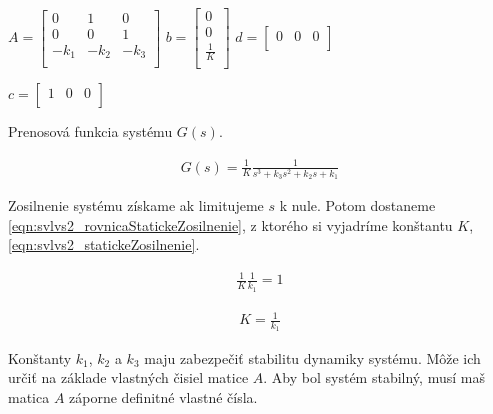 \documentclass[../main.tex]{subfiles}
\begin{document}
        \begin{center}
		$ A = 
			\begin{bmatrix} 
			0 & 1 & 0 \\ 
			0 & 0 & 1 \\ 
			-k_1 & -k_2 & -k_3  \\ 
			\end{bmatrix}$
		$ b = 
			\begin{bmatrix} 
			0 \\ 
			0 \\ 
			\frac{1}{K}  \\ 
			\end{bmatrix}$
		$ d = 
			\begin{bmatrix} 
			0 & 0 & 0  \\
			\end{bmatrix}$

		$ c = 
			\begin{bmatrix} 
			1 & 0 & 0  \\
			\end{bmatrix}$
        \end{center}

Prenosová funkcia systému $G(s)$.

	\begin{equation}
		\begin{aligned}
		G(s) = \frac{1}{K}\frac{1}{s^3+k_3s^2+k_2s+k_1}
		\end{aligned}
		\label{eqn:svlvs2_linearnySystemPrenos}
	\end{equation}

Zosilnenie systému získame ak limitujeme $s$ k nule. Potom dostaneme \cref{eqn:svlvs2_rovnicaStatickeZosilnenie}, z ktorého si vyjadríme konštantu $K$,  \cref{eqn:svlvs2_statickeZosilnenie}.

	\begin{equation}
		\begin{aligned}
		\frac{1}{K}\frac{1}{k_1} = 1
		\end{aligned}
		\label{eqn:svlvs2_rovnicaStatickeZosilnenie}
	\end{equation}

	\begin{equation}
		\begin{aligned}
		K = \frac{1}{k_1}
		\end{aligned}
		\label{eqn:svlvs2_statickeZosilnenie}
	\end{equation}

Konštanty $k_1$, $k_2$ a $k_3$ maju zabezpečiť stabilitu dynamiky systému. Môže ich určiť na základe vlastných čisiel matice $A$. Aby bol systém stabilný, musí maš matica $A$ záporne definitné vlastné čísla.
\end{document}
